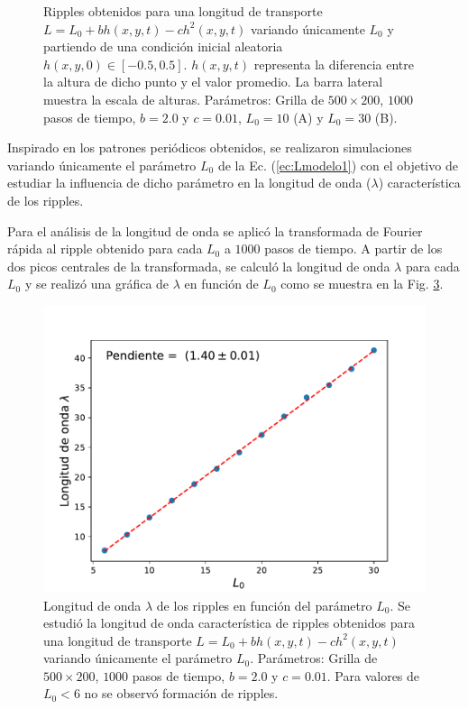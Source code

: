 \documentclass[11pt,twocolumn,twoside]{opticajnl}
\begin{document}
\begin{figure}[H]
\begin{subfigure}[b]{\linewidth}
         \label{fig:ripple_L0=30}
     \end{subfigure}
\caption{\centering Ripples obtenidos para una longitud de transporte $L = L_0 + bh(x,y,t) - ch^2(x,y,t)$ variando únicamente $L_0$  y partiendo de una condición inicial aleatoria $h(x,y,0) \in [-0.5,0.5]$. $h(x,y,t)$ representa la diferencia entre la altura de dicho punto y el valor promedio. La barra lateral muestra la escala de alturas. Parámetros: Grilla de $500 \times 200$, $1000$ pasos de tiempo, $b=2.0$ y $c=0.01$, $L_0 = 10$ (A) y $L_0 = 30$ (B).} 
\label{fig:ripples}
\end{figure}

Inspirado en los patrones periódicos obtenidos, se realizaron simulaciones variando únicamente el parámetro $L_0$ de la Ec. (\ref{ec:Lmodelo1}) con el objetivo de estudiar la influencia de dicho parámetro en la longitud de onda ($\lambda$) característica de los ripples. 

Para el análisis de la longitud de onda se aplicó la transformada de Fourier rápida al ripple obtenido para cada $L_0$ a $1000$ pasos de tiempo. A partir de los dos picos centrales de la transformada, se calculó la longitud de onda $\lambda$ para cada $L_0$ y se realizó una gráfica de $\lambda$ en función de $L_0$ como se muestra en la Fig. \ref{fig:lambdavsL}.

\begin{figure}[H]
\centering
\includegraphics[width=\linewidth]{Figuras/fvsL0.pdf}
\caption{Longitud de onda $\lambda$ de los ripples en función del parámetro $L_0$. Se estudió la longitud de onda característica de ripples obtenidos para una longitud de transporte $L = L_0 + bh(x,y,t) - ch^2(x,y,t)$ variando únicamente el parámetro $L_0$. Parámetros: Grilla de $500 \times 200$, $1000$ pasos de tiempo, $b=2.0$ y $c=0.01$. Para valores de $L_0 < 6$ no se observó formación de ripples.}
\label{fig:lambdavsL}
\end{figure}
\end{document}

